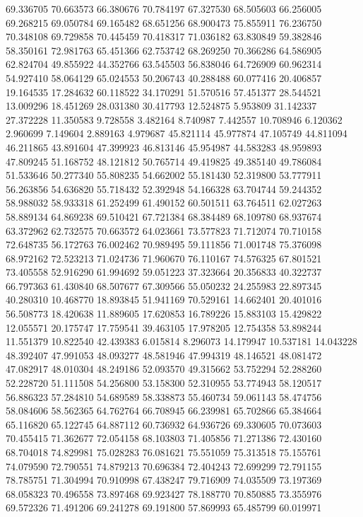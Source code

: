 69.336705
70.663573
66.380676
70.784197
67.327530
68.505603
66.256005
69.268215
69.050784
69.165482
68.651256
68.900473
75.855911
76.236750
70.348108
69.729858
70.445459
70.418317
71.036182
63.830849
59.382846
58.350161
72.981763
65.451366
62.753742
68.269250
70.366286
64.586905
62.824704
49.855922
44.352766
63.545503
56.838046
64.726909
60.962314
54.927410
58.064129
65.024553
50.206743
40.288488
60.077416
20.406857
19.164535
17.284632
60.118522
34.170291
51.570516
57.451377
28.544521
13.009296
18.451269
28.031380
30.417793
12.524875
5.953809
31.142337
27.372228
11.350583
9.728558
3.482164
8.740987
7.442557
10.708946
6.120362
2.960699
7.149604
2.889163
4.979687
45.821114
45.977874
47.105749
44.811094
46.211865
43.891604
47.399923
46.813146
45.954987
44.583283
48.959893
47.809245
51.168752
48.121812
50.765714
49.419825
49.385140
49.786084
51.533646
50.277340
55.808235
54.662002
55.181430
52.319800
53.777911
56.263856
54.636820
55.718432
52.392948
54.166328
63.704744
59.244352
58.988032
58.933318
61.252499
61.490152
60.501511
63.764511
62.027263
58.889134
64.869238
69.510421
67.721384
68.384489
68.109780
68.937674
63.372962
62.732575
70.663572
64.023661
73.577823
71.712074
70.710158
72.648735
56.172763
76.002462
70.989495
59.111856
71.001748
75.376098
68.972162
72.523213
71.024736
71.960670
76.110167
74.576325
67.801521
73.405558
52.916290
61.994692
59.051223
37.323664
20.356833
40.322737
66.797363
61.430840
68.507677
67.309566
55.050232
24.255983
22.897345
40.280310
10.468770
18.893845
51.941169
70.529161
14.662401
20.401016
56.508773
18.420638
11.889605
17.620853
16.789226
15.883103
15.429822
12.055571
20.175747
17.759541
39.463105
17.978205
12.754358
53.898244
11.551379
10.822540
42.439383
6.015814
8.296073
14.179947
10.537181
14.043228
48.392407
47.991053
48.093277
48.581946
47.994319
48.146521
48.081472
47.082917
48.010304
48.249186
52.093570
49.315662
53.752294
52.288260
52.228720
51.111508
54.256800
53.158300
52.310955
53.774943
58.120517
56.886323
57.284810
54.689589
58.338873
55.460734
59.061143
58.474756
58.084606
58.562365
64.762764
66.708945
66.239981
65.702866
65.384664
65.116820
65.122745
64.887112
60.736932
64.936726
69.330605
70.073603
70.455415
71.362677
72.054158
68.103803
71.405856
71.271386
72.430160
68.704018
74.829981
75.028283
76.081621
75.551059
75.313518
75.155761
74.079590
72.790551
74.879213
70.696384
72.404243
72.699299
72.791155
78.785751
71.304994
70.910998
67.438247
79.716909
74.035509
73.197369
68.058323
70.496558
73.897468
69.923427
78.188770
70.850885
73.355976
69.572326
71.491206
69.241278
69.191800
57.869993
65.485799
60.019971
